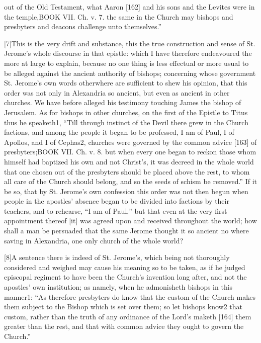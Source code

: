 out of the Old Testament, what Aaron [162] and his sons and the Levites were in the temple,BOOK VII. Ch. v. 7. the same in the Church may bishops and presbyters and deacons challenge unto themselves.”

[7]This is the very drift and substance, this the true construction and sense of St. Jerome’s whole discourse in that epistle: which I have therefore endeavoured the more at large to explain, because no one thing is less effectual or more usual to be alleged against the ancient authority of bishops; concerning whose government St. Jerome’s own words otherwhere are sufficient to shew his opinion, that this order was not only in Alexandria so ancient, but even as ancient in other churches. We have before alleged his testimony touching James the bishop of Jerusalem. As for bishops in other churches, on the first of the Epistle to Titus thus he speaketh1, “Till through instinct of the Devil there grew in the Church factions, and among the people it began to be professed, I am of Paul, I of Apollos, and I of Cephas2, churches were governed by the common advice [163] of presbyters;BOOK VII. Ch. v. 8. but when every one began to reckon those whom himself had baptized his own and not Christ’s, it was decreed in the whole world that one chosen out of the presbyters should be placed above the rest, to whom all care of the Church should belong, and so the seeds of schism be removed.” If it be so, that by St. Jerome’s own confession this order was not then begun when people in the apostles’ absence began to be divided into factions by their teachers, and to rehearse, “I am of Paul,” but that even at the very first appointment thereof [it] was agreed upon and received throughout the world; how shall a man be persuaded that the same Jerome thought it so ancient no where saving in Alexandria, one only church of the whole world?

[8]A sentence there is indeed of St. Jerome’s, which being not thoroughly considered and weighed may cause his meaning so to be taken, as if he judged episcopal regiment to have been the Church’s invention long after, and not the apostles’ own institution; as namely, when he admonisheth bishops in this manner1: “As therefore presbyters do know that the custom of the Church makes them subject to the Bishop which is set over them; so let bishops know2 that custom, rather than the truth of any ordinance of the Lord’s maketh [164] them greater than the rest, and that with common advice they ought to govern the Church.”

